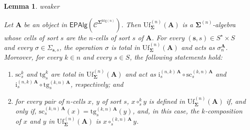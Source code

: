 \documentclass[a4paper, reqno]{amsbook}
\makeatletter
\newcommand{\sig}[1]{\mathbf{#1}}             %
\newcommand{\spec}[1]{\boldsymbol{\mathcal{#1}}} %
\newcommand{\htg}{\mathrm{htg}}                %
\newcommand{\src}{\mathrm{sc}}
\newcommand{\tgt}{\mathrm{tg}}
\newcommand{\Uf}{\mathrm{Uf}}
\theoremstyle{plain}
\newtheorem{lemma}[theorem]{Lemma}
\theoremstyle{definition}
\newcommand*{\CA@leanpending}{}
\newcommand*{\CA@leanrelation}{}
\newcommand*{\lean}[2]{%
  \ifcsname\string\color@lean@#1\endcsname\else
    \PackageError{main}{Unknown relation `#1' in \string\lean}{Use equivalent, weaker or stronger.}%
  \fi
  \gdef\CA@leanrelation{#1}%
  \gdef\CA@leanpending{#2}}
\makeatother
\begin{document}
\begin{lemma}\label{LUfDescription}\lean{weaker}{Presentations.unificationRealization,Presentations.unifiedAlgebra}
Let $\mathbf{A}$ be an object in $\mathsf{EPAlg}(\spec{C}^{\sig{\Sigma}^{\htg(n)}})$.
Then $\Uf^{(n)}_{\sig{\Sigma}}(\mathbf{A})$ is a $\sig{\Sigma}^{(n)}$-algebra whose cells of sort $s$ are the $n$-cells of sort $s$ of $\mathbf{A}$.
For every $(\mathbf{s},s)\in S^{\star}\times S$ and every $\sigma\in\Sigma_{\mathbf{s},s}$, the operation $\sigma$ is total in $\Uf^{(n)}_{\sig{\Sigma}}(\mathbf{A})$ and acts as $\sigma_n^{\mathbf{A}}$.
Moreover, for every $k\in n$ and every $s\in S$, the following statements hold:
\begin{enumerate}
\item $\src^{k}_{s}$ and $\tgt^{k}_{s}$ are total in $\Uf^{(n)}_{\sig{\Sigma}}(\mathbf{A})$ and act as $\mathrm{i}^{(n,k)\,\mathbf{A}}_{s}\circ\src^{(k,n)\,\mathbf{A}}_{s}$ and $\mathrm{i}^{(n,k)\,\mathbf{A}}_{s}\circ\tgt^{(k,n)\,\mathbf{A}}_{s}$, respectively; and
\item for every pair of $n$-cells $x$, $y$ of sort $s$, $x\circ^{k}_{s}y$ is defined in $\Uf^{(n)}_{\sig{\Sigma}}(\mathbf{A})$ if, and only if, $\src^{(k,n)\,\mathbf{A}}_{s}(x)=\tgt^{(k,n)\,\mathbf{A}}_{s}(y)$, and, in this case, the $k$-composition of $x$ and $y$ in $\Uf^{(n)}_{\sig{\Sigma}}(\mathbf{A})$ is $x\circ^{(k,n)\,\mathbf{A}}_{s}y$.
\end{enumerate}
\end{lemma}
\end{document}
